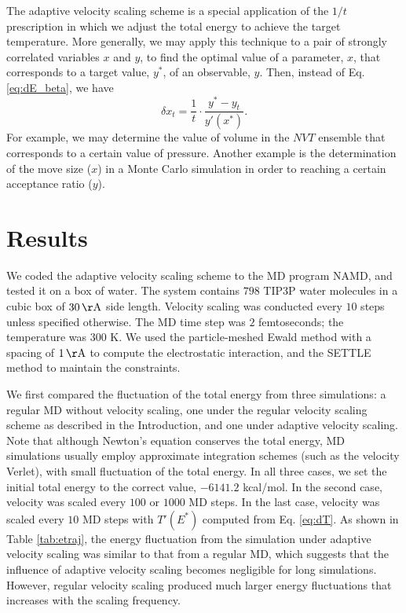 \documentclass[reprint]{revtex4-1}
\begin{document}
The adaptive velocity scaling scheme
is a special application of the $1/t$ prescription
in which we adjust the total energy
to achieve the target temperature.
%
More generally, we may apply this technique
to a pair of strongly correlated variables $x$ and $y$,
to find the optimal value of a parameter, $x$,
that corresponds to a target value, $y^*$, of an observable, $y$.
%
Then, instead of Eq. \eqref{eq:dE_beta},
we have
\begin{equation}
  \delta x_t = \frac 1 t
  \cdot
  \frac{ y^* - y_t }
       { y'(x^*) }
  .
  \label{eq:adjustxy}
\end{equation}
%
For example, we may determine the value of volume in the $NVT$ ensemble
that corresponds to a certain value of pressure.
%
Another example is the determination of the
move size ($x$)
in a Monte Carlo simulation
in order to reaching a certain acceptance ratio ($y$).




\section{Results}



We coded the adaptive velocity scaling scheme to
the MD program NAMD\cite{NAMD},
and tested it on a box of water.
%
The system contains
$798$ TIP3P water molecules\cite{jorgensen1983}
in a cubic box of $30 \, \mathrm{\AA}$ side length.
%
Velocity scaling was conducted every $10$ steps
unless specified otherwise.
%
The MD time step was $2$ femtoseconds;
the temperature was $300$ K.
%
We used the particle-meshed Ewald method\cite{essmann1995}
with a spacing of $1 \, \mathrm{\AA}$
to compute the electrostatic interaction,
and the SETTLE method\cite{miyamoto1992}
to maintain the constraints.


We first compared the fluctuation of the total energy
from three simulations:
%
a regular MD without velocity scaling,
one under the regular velocity scaling scheme as described in the Introduction,
and one under adaptive velocity scaling.
%
Note that although Newton's equation conserves the total energy,
MD simulations usually employ approximate integration schemes
(such as the velocity Verlet),
with
small fluctuation of the total energy.
%
In all three cases,
we set the initial total energy to the correct value, $-6141.2$ kcal/mol.
%
In the second case,
velocity was scaled every $100$ or $1000$ MD steps.
%
In the last case,
velocity was scaled every $10$ MD steps with
$T'(E^*)$ computed from Eq. \eqref{eq:dT}.
%
As shown in Table \ref{tab:etraj},
the energy fluctuation from the simulation under adaptive velocity scaling
was similar to that from a regular MD,
which suggests that the influence of adaptive velocity scaling
becomes negligible for long simulations.
%
However, regular velocity scaling
produced much larger energy fluctuations
that increases with the scaling frequency.
\end{document}
